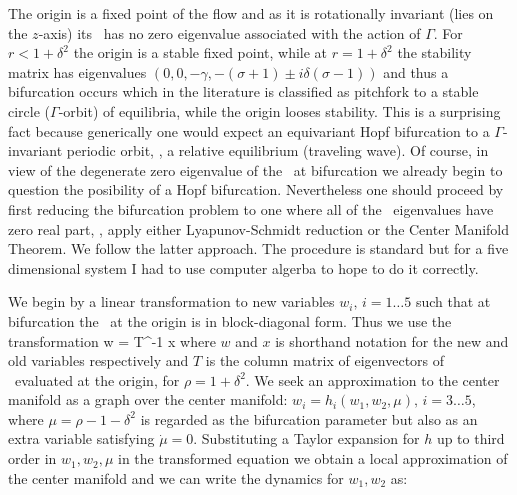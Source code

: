 The origin is a fixed point of the flow and as it is rotationally
invariant (lies on the $z$-axis) its \stabmat\ has no zero eigenvalue
associated with the action of $\Gamma$. For $r<1+\delta^2$ the origin is
a stable fixed point, while at $r=1+\delta^2$ the stability matrix has
eigenvalues $ \left(0,0,-\gamma ,-(\sigma+1) \pm i \delta  (\sigma-1)
\right)$ and  thus a bifurcation occurs which in the
literature is classified as pitchfork to a stable circle
($\Gamma$-orbit) of equilibria, while the origin looses stability. This
is a surprising fact because generically  one would expect an
equivariant Hopf bifurcation to a $\Gamma$-invariant periodic orbit, \ie,
a relative equilibrium (traveling wave). Of course, in view of the
degenerate zero eigenvalue of the \stabmat\ at bifurcation we already
begin to question the posibility of a Hopf bifurcation. Nevertheless one
should proceed by first reducing the bifurcation problem to one where all
of the \stabmat\ eigenvalues have zero real part, \ie, apply either
Lyapunov-Schmidt reduction or the Center Manifold
Theorem. We follow the latter approach. The procedure is
standard but for a five dimensional system I had to use computer algerba
to hope to do it correctly.

We begin by a linear transformation to new variables $w_i,\, i=1\ldots 5$ such that at bifurcation
the \stabmat\ at the origin is in block-diagonal form. Thus we use the transformation
\beq
	w = T^{-1} x
\eeq
where $w$ and $x$ is shorthand notation for the new and old variables respectively and $T$ is the column matrix of
eigenvectors of \stabmat\ evaluated at the origin, for $\rho=1+\delta^2$. We seek an approximation to the center manifold
as a graph over the center manifold: $w_i = h_i(w_1,w_2,\mu),\, i=3\ldots5$, where $\mu=\rho-1-\delta^2$ is regarded
as the bifurcation parameter but also as an extra variable satisfying $\dot{\mu}=0$. Substituting a Taylor expansion for $h$
up to third order in $w_1,w_2,\mu$ in the transformed equation we obtain a local approximation of the center manifold
and we can write the dynamics for $w_1,w_2$ as:

